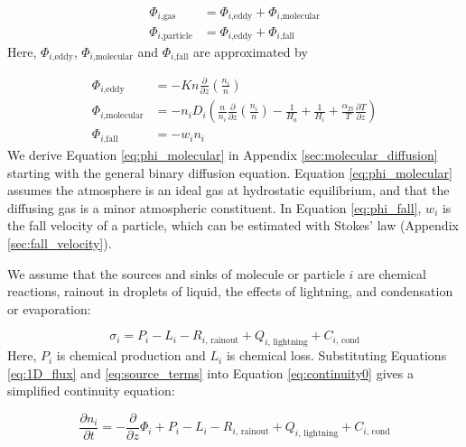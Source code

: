 \begin{align}
  \Phi_{i\text{,gas}} &= \Phi_{i\text{,eddy}} + \Phi_{i\text{,molecular}} \label{eq:phi_gas} \\
  \Phi_{i\text{,particle}} &= \Phi_{i\text{,eddy}} + \Phi_{i\text{,fall}} \label{eq:phi_particle}
\end{align}
Here, $\Phi_{i\text{,eddy}}$, $\Phi_{i\text{,molecular}}$ and $\Phi_{i\text{,fall}}$ are approximated by

\begin{align}
  \Phi_{i\text{,eddy}} &= - Kn\frac{\partial}{\partial z}\left( \frac{n_{i}}{n} \right) \label{eq:phi_eddy}\\ 
  \Phi_{i\text{,molecular}} &= -n_i D_{i} \left( \frac{n}{n_i} \frac{\partial}{\partial z} \left(\frac{n_i}{n}\right) - \frac{1}{H_a} + \frac{1}{H_i} + \frac{\alpha_{Ti}}{T} \frac{\partial T}{\partial z} \right) \label{eq:phi_molecular} \\
  \Phi_{i\text{,fall}} &= - w_i n_i \label{eq:phi_fall}
\end{align}
We derive Equation \eqref{eq:phi_molecular} in Appendix \ref{sec:molecular_diffusion} starting with the general binary diffusion equation. Equation \eqref{eq:phi_molecular} assumes the atmosphere is an ideal gas at hydrostatic equilibrium, and that the diffusing gas is a minor atmospheric constituent. In Equation \eqref{eq:phi_fall}, $w_i$ is the fall velocity of a particle, which can be estimated with Stokes' law (Appendix \ref{sec:fall_velocity}).

We assume that the sources and sinks of molecule or particle $i$ are chemical reactions, rainout in droplets of liquid, the effects of lightning, and condensation or evaporation:

\begin{equation} \label{eq:source_terms}
  \sigma_i = P_{i} - L_{i} - R_{i\text{, rainout}} + Q_{i\text{, lightning}} + C_{i\text{, cond}}
\end{equation}
Here, $P_{i}$ is chemical production and $L_i$ is chemical loss. Substituting Equations \eqref{eq:1D_flux} and \eqref{eq:source_terms} into Equation \eqref{eq:continuity0} gives a simplified continuity equation:

\begin{equation} \label{eq:continuity}
\frac{\partial n_{i}}{\partial t} = - \frac{\partial}{\partial z}\Phi_{i} + P_{i} - L_{i} - R_{i\text{, rainout}} + Q_{i\text{, lightning}} + C_{i\text{, cond}}
\end{equation}

